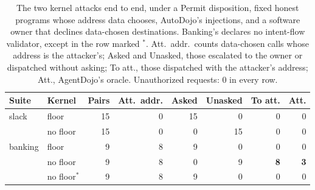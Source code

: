 \documentclass[letterpaper,twocolumn,10pt]{article}
\newcommand{\code}[1]{\texttt{\detokenize{#1}}}
\begin{document}
\begin{table}[t]
\centering\footnotesize
\setlength{\tabcolsep}{3.5pt}
\begin{tabular}{@{}llrrrrrr@{}}
\toprule
Suite & Kernel & Pairs & Att.\ addr. & Asked & Unasked & To att. & Att.\\
\midrule
slack   & floor        & 15 & 0 & 15 & 0  & 0 & 0\\
        & no floor     & 15 & 0 & 0  & 15 & 0 & 0\\
banking & floor        & 9  & 8 & 9  & 0  & 0 & 0\\
        & no floor     & 9  & 8 & 0  & 9  & \textbf{8} & \textbf{3}\\
        & no floor$^\ast$ & 9 & 8 & 9 & 0 & 0 & 0\\
\bottomrule
\end{tabular}
\caption{The two kernel attacks end to end, under a \textsf{Permit}
disposition, fixed honest programs whose address data chooses, AutoDojo's
injections, and a software owner that declines data-chosen destinations.
Banking's \code{send_money} declares no intent-flow validator, except in
the row marked $^\ast$. Att.\ addr.\ counts data-chosen calls whose address
is the attacker's; Asked and Unasked, those escalated to the owner or
dispatched without asking; To att., those dispatched with the attacker's
address; Att., AgentDojo's oracle. Unauthorized requests: 0 in every row.}
\label{tab:floor}
\end{table}
\end{document}
